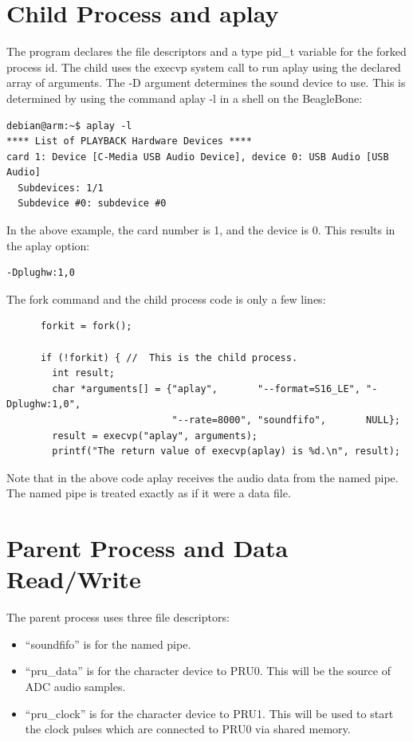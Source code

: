 	\section{Child Process and aplay}
	
The program declares the file descriptors and a type pid\_t variable for the forked process id.  The child uses the execvp system call to run aplay using the declared array of arguments.  The -D argument determines the sound device to use.  This is determined by using the command aplay -l in a shell on the BeagleBone:

\begin{verbatim}
debian@arm:~$ aplay -l
**** List of PLAYBACK Hardware Devices ****
card 1: Device [C-Media USB Audio Device], device 0: USB Audio [USB Audio]
  Subdevices: 1/1
  Subdevice #0: subdevice #0
\end{verbatim} 

In the above example, the card number is 1, and the device is 0.  This results
in the aplay option:

\begin{verbatim}
-Dplughw:1,0
\end{verbatim}
	
The fork command and the child process code is only a few lines:	
	
	\begin{verbatim}
	  forkit = fork();
	
	  if (!forkit) { //  This is the child process.
	    int result;
	    char *arguments[] = {"aplay",       "--format=S16_LE", "-Dplughw:1,0",
	                         "--rate=8000", "soundfifo",       NULL};
	    result = execvp("aplay", arguments);
	    printf("The return value of execvp(aplay) is %d.\n", result);
	\end{verbatim}
	
	Note that in the above code aplay receives the audio data from the named pipe.  The named pipe is treated exactly as if it were a data file.
	
	\section{Parent Process and Data Read/Write}
		
		The parent process uses three file descriptors:
		
		\begin{itemize}
		\item ``soundfifo'' is for the named pipe.
		\item ``pru\_data'' is for the character device to PRU0.  This will be the source of ADC audio samples.
		\item ``pru\_clock'' is for the character device to PRU1.  This will be used to start the clock pulses which are connected to PRU0 via shared memory.
		\end{itemize}
	
